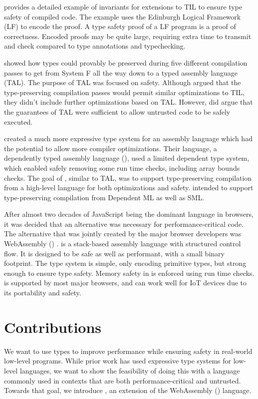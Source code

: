 \citet{PCC} provides a detailed example of invariants for extensions to TIL to ensure type safety of compiled code.
The example uses the Edinburgh Logical Framework (LF) to encode the proof.
A type safety proof of a LF program is a proof of correctness.
Encoded proofs may be quite large, requiring extra time to transmit and check compared to type annotations and typechecking.

\citet{FtoTAL} showed how types could provably be preserved during five different compilation passes to get from System F all the way down to a typed assembly language (TAL).
The purpose of TAL was focused on safety.
Although \citet{FtoTAL} argued that the type-preserving compilation passes would permit similar optimizations to TIL, they didn't include further optimizations based on TAL.
However, \citet{FtoTAL} did argue that the guarantees of TAL were sufficient to allow untrusted code to be safely executed.

\citet{DTAL} created a much more expressive type system for an assembly language which had the potential to allow more compiler optimizations.
Their language, a dependently typed assembly language (\dtal), used a limited dependent type system, which enabled safely removing some run time checks, including array bounds checks.
The goal of \dtal, similar to TAL, was to support type-preserving compilation from a high-level language for both optimizations and safety.
\dtal intended to support type-preserving compilation from Dependent ML as well as SML.

After almost two decades of JavaScript being the dominant language in browsers, it was decided that an alternative was necessary for performance-critical code.
The alternative that was jointly created by the major browser developers was WebAssembly (\wasm) \cite{WASM}.
\wasm is a stack-based assembly language with structured control flow.
It is designed to be safe as well as performant, with a small binary footprint.
The \wasm type system is simple, only encoding primitive types, but strong enough to ensure type safety.
Memory safety in \wasm is enforced using run time checks.
\wasm is supported by most major browsers, and can work well for IoT devices due to its portability and safety.

\section{Contributions}
We want to use types to improve performance while ensuring safety in real-world low-level programs.
While prior work has used expressive type systems for low-level languages, we want to show the feasibility of doing this with a language commonly used in contexts that are both performance-critical and untrusted.
Towards that goal, we introduce \name, an extension of the WebAssembly (\wasm) language.

